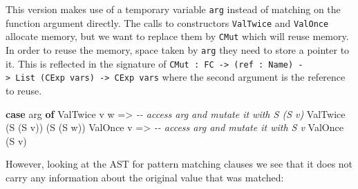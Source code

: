 \documentclass[
]{article}
\newenvironment{Shaded}{}{}
\newcommand{\CommentTok}[1]{\textcolor[rgb]{0.38,0.63,0.69}{\textit{#1}}}
\newcommand{\DataTypeTok}[1]{\textcolor[rgb]{0.56,0.13,0.00}{#1}}
\newcommand{\KeywordTok}[1]{\textcolor[rgb]{0.00,0.44,0.13}{\textbf{#1}}}
\newcommand{\NormalTok}[1]{#1}
\newcommand{\OtherTok}[1]{\textcolor[rgb]{0.00,0.44,0.13}{#1}}
\begin{document}
This version makes use of a temporary variable \texttt{arg} instead of
matching on the function argument directly. The calls to constructors
\texttt{ValTwice} and \texttt{ValOnce} allocate memory, but we want to
replace them by \texttt{CMut} which will reuse memory. In order to reuse
the memory, space taken by \texttt{arg} they need to store a pointer to
it. This is reflected in the signature of
\texttt{CMut\ :\ FC\ -\textgreater{}\ (ref\ :\ Name)\ -\textgreater{}\ List\ (CExp\ vars)\ -\textgreater{}\ CExp\ vars}
where the second argument is the reference to reuse.

\begin{Shaded}
\begin{Highlighting}[]
\KeywordTok{case}\NormalTok{ arg }\KeywordTok{of}
     \DataTypeTok{ValTwice}\NormalTok{ v w }\OtherTok{=\textgreater{}} \CommentTok{{-}{-} access \textasciigrave{}arg\textasciigrave{} and mutate it with S (S v)}
                     \DataTypeTok{ValTwice}\NormalTok{ (}\DataTypeTok{S}\NormalTok{ (}\DataTypeTok{S}\NormalTok{ v)) (}\DataTypeTok{S}\NormalTok{ (}\DataTypeTok{S}\NormalTok{ w))}
     \DataTypeTok{ValOnce}\NormalTok{ v }\OtherTok{=\textgreater{}} \CommentTok{{-}{-} access \textasciigrave{}arg\textasciigrave{} and mutate it with S v}
                  \DataTypeTok{ValOnce}\NormalTok{ (}\DataTypeTok{S}\NormalTok{ v)}
\end{Highlighting}
\end{Shaded}

However, looking at the AST for pattern matching clauses we see that it
does not carry any information about the original value that was
matched:
\end{document}

